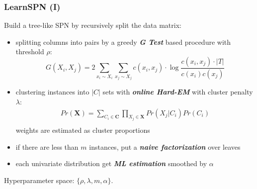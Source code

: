 \documentclass[xcolor={usenames,dvipsnames,svgnames}, compress]{beamer}
\begin{document}
\begin{frame}[t]
  \frametitle{LearnSPN (I)}
  \footnotesize
  Build a tree-like SPN by recursively split the data matrix:

  \begin{itemize}
  \item splitting columns into pairs by a greedy \textbf{\emph{G Test}} based
    procedure with threshold $\rho$:
    \[
      G(X_i, X_j) =  2\sum_{x_i \sim X_i}\sum_{x_j \sim X_j}c(x_i, x_j)\cdot \log\frac{c(x_i, x_j)\cdot |T|}{c(x_i)c(x_j)}
    \]
  \item clustering instances into $|C|$ sets with \textbf{\emph{online Hard-EM}} with cluster penalty
    $\lambda$:
    \[\begin{array}{cc}
        Pr(\mathbf{X})= \sum_{C_i \in \mathbf{C}}\prod_{X_j \in \mathbf{X}}Pr(X_j|C_i)Pr(C_i)\\
      \end{array}\]
    weights are estimated as cluster proportions
  \item if there are less than $m$ instances, put a \textbf{\emph{naive
        factorization}} over leaves
  \item each univariate distribution get \emph{\textbf{ML estimation}} smoothed by $\alpha$  
  \end{itemize}\par\bigskip

  Hyperparameter space: $\{\rho, \lambda, m, \alpha\}$.
  

\end{frame}
\end{document}
